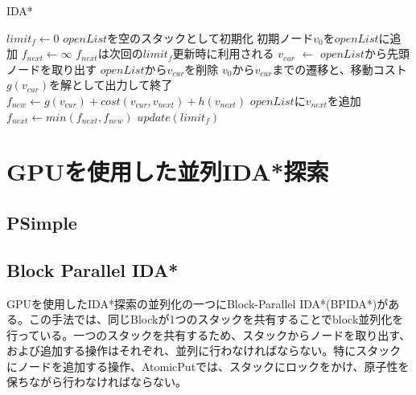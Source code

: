 \documentclass[a4paper,11pt,oneside,openany]{jsbook}
\begin{document}
\newpage
\begin{algorithm}
\caption{IDA*}
\label{alg:pbnf}
\begin{algorithmic}[1]
\State $limit_f \leftarrow 0$
    \State $openList$を空のスタックとして初期化
    \State 初期ノード$v_0$を$openList$に追加
    \State $f_{next} \leftarrow \infty$
    \State $f_{next}$は次回の$limit_f$更新時に利用される 
        \State $v_{cur}$ $\leftarrow$ $openList$から先頭ノードを取り出す
        \State $openList$から$v_{cur}$を削除
            \State $v_0$から$v_{cur}$までの遷移と、移動コスト$g(v_{cur})$を解として出力して終了
        \EndIf
            \State $f_{new} \leftarrow g(v_{cur}) + cost(v_{cur}, v_{next}) + h(v_{next})$
                \State $openList$に$v_{next}$を追加
            \Else
                \State $f_{next} \leftarrow min(f_{next}, f_{new})$
            \EndIf
        \EndFor
    \EndWhile
    \State $update(limit_f)$
\EndWhile
\end{algorithmic}
\end{algorithm}
\newpage



\chapter{GPUを使用した並列IDA*探索}
\section{PSimple}

\section{Block Parallel IDA*}
GPUを使用したIDA*探索の並列化の一つにBlock-Parallel IDA*(BPIDA*)\cite{Horie17}がある。この手法では、同じBlockが1つのスタックを共有することでblock並列化を行っている。一つのスタックを共有するため、スタックからノードを取り出す、および追加する操作はそれぞれ、並列に行わなければならない。特にスタックにノードを追加する操作、AtomicPutでは、スタックにロックをかけ、原子性を保ちながら行わなければならない。
\end{document}
